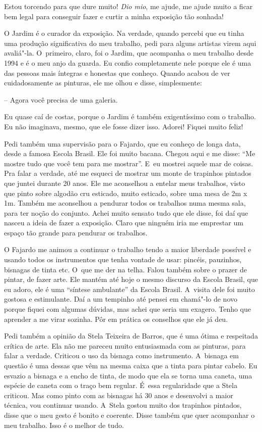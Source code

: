 Estou torcendo para que dure muito! \emph{Dio mio}, me ajude, me ajude
muito a ficar bem legal para conseguir fazer e curtir a minha exposição
tão sonhada!

O Jardim é o curador da exposição. Na verdade, quando percebi que eu
tinha uma produção significativa do meu trabalho, pedi para alguns
artistas virem aqui avaliá"-la. O~primeiro, claro, foi o Jardim, que
acompanha o meu trabalho desde 1994 e é o meu anjo da guarda. Eu confio
completamente nele porque ele é uma das pessoas mais íntegras e honestas
que conheço. Quando acabou de ver cuidadosamente as pinturas, ele me
olhou e disse, simplesmente:

-- Agora você precisa de uma galeria.

Eu quase caí de costas, porque o Jardim é também exigentíssimo com o
trabalho. Eu não imaginava, mesmo, que ele fosse dizer isso. Adorei!
Fiquei muito feliz!

Pedi também uma supervisão para o Fajardo, que eu conheço de longa data,
desde a famosa Escola Brasil. Ele foi muito bacana. Chegou aqui e me
disse: ``Me mostre tudo que você tem para me mostrar''. E~eu mostrei
aquele mar de coisas. Pra falar a verdade, até me esqueci de mostrar um
monte de trapinhos pintados que juntei durante 20 anos. Ele me
aconselhou a entelar meus trabalhos, visto que pinto sobre algodão cru
esticado, muito esticado, sobre uma mesa de 2m x 1m. Também me
aconselhou a pendurar todos os trabalhos numa mesma sala, para ter noção
do conjunto. Achei muito sensato tudo que ele disse, foi daí que nasceu
a ideia de fazer a exposição. Claro que ninguém iria me emprestar um
espaço tão grande para pendurar os trabalhos.

O Fajardo me animou a continuar o trabalho tendo a maior liberdade
possível e usando todos os instrumentos que tenha vontade de usar:
pincéis, pauzinhos, bisnagas de tinta etc. O~que me der na telha. Falou
também sobre o prazer de pintar, de fazer arte. Ele mantém até hoje o
mesmo discurso da Escola Brasil, que eu adoro, ele é uma ``síntese
ambulante'' da Escola Brasil. A~visita dele foi muito gostosa e
estimulante. Daí a um tempinho até pensei em chamá"-lo de novo porque
fiquei com algumas dúvidas, mas achei que seria um exagero. Tenho que
aprender a me virar sozinha. Pôr em prática os conselhos que ele já deu.

Pedi também a opinião da Stela Teixeira de Barros, que é uma ótima e
respeitada crítica de arte. Ela não me pareceu muito entusiasmada com as
pinturas, para falar a verdade. Criticou o uso da bisnaga como
instrumento. A~bisnaga em questão é uma dessas que vêm na mesma caixa
que a tinta para pintar cabelo. Eu esvazio a bisnaga e a encho de tinta,
de modo que ela se torna uma caneta, uma espécie de caneta com o traço
bem regular. É~essa regularidade que a Stela criticou. Mas como pinto
com as bisnagas há 30 anos e desenvolvi a maior técnica, vou continuar
usando. A~Stela gostou muito dos trapinhos pintados, disse que o meu
gesto é bonito e coerente. Disse também que quer acompanhar o meu
trabalho. Isso é o melhor de tudo.

